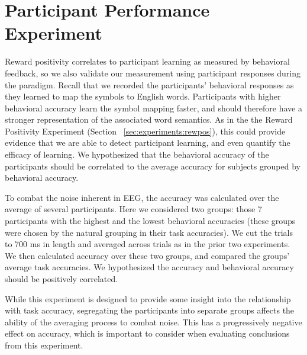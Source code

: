 \section{Participant Performance Experiment}
Reward positivity correlates to participant learning as measured by behavioral 
feedback, so we also validate our measurement using participant responses 
during the paradigm. Recall that we recorded the participants' behavioral 
responses as they learned to map the symbols to English words. Participants 
with higher behavioral accuracy learn the symbol mapping faster, and should 
therefore have a stronger representation of the associated word semantics. As 
in the the Reward Positivity Experiment (Section 
~\ref{sec:experiments:rewpos}), this could provide evidence that we are able to 
detect participant learning, and even quantify the efficacy of learning. We 
hypothesized that the behavioral accuracy of the participants should be 
correlated to the average \tvt accuracy for subjects grouped by behavioral 
accuracy.

To combat the noise inherent in EEG, the \tvt accuracy was calculated over the 
average of several participants. Here we considered two groups: those 7 
participants with the highest and the lowest behavioral accuracies (these 
groups were chosen by the natural grouping in their task accuracies). We cut 
the trials to 700 ms in length and averaged across trials as in the prior two 
experiments. We then calculated \tvt accuracy over these two groups, and 
compared the groups' average task accuracies. We hypothesized the \tvt accuracy 
and behavioral accuracy should be positively correlated.

While this experiment is designed to provide some insight into the relationship 
with task accuracy, segregating the participants into separate groups affects 
the ability of the averaging process to combat noise. This has a progressively 
negative effect on \tvt accuracy, which is important to consider when 
evaluating conclusions from this experiment.
